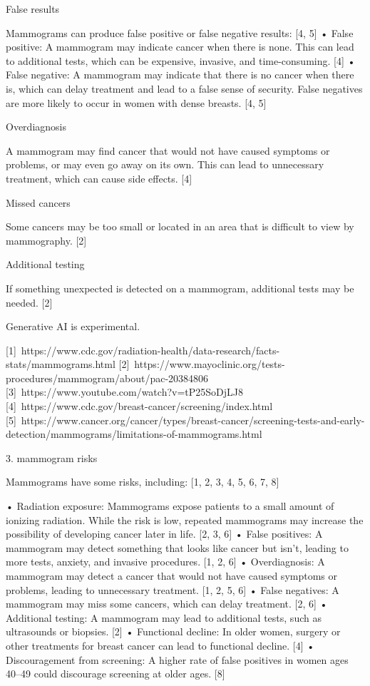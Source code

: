 False results 

Mammograms can produce false positive or false negative results: [4, 5]  • False positive: A mammogram may indicate cancer when there is none. This can lead to additional tests, which can be expensive, invasive, and time-consuming. [4]  
• False negative: A mammogram may indicate that there is no cancer when there is, which can delay treatment and lead to a false sense of security. False negatives are more likely to occur in women with dense breasts. [4, 5]  



Overdiagnosis 

A mammogram may find cancer that would not have caused symptoms or problems, or may even go away on its own. This can lead to unnecessary treatment, which can cause side effects. [4]  

Missed cancers 

Some cancers may be too small or located in an area that is difficult to view by mammography. [2]  

Additional testing 

If something unexpected is detected on a mammogram, additional tests may be needed. [2]  



Generative AI is experimental.

[1] https://www.cdc.gov/radiation-health/data-research/facts-stats/mammograms.html
[2] https://www.mayoclinic.org/tests-procedures/mammogram/about/pac-20384806
[3] https://www.youtube.com/watch?v=tP25SoDjLJ8
[4] https://www.cdc.gov/breast-cancer/screening/index.html
[5] https://www.cancer.org/cancer/types/breast-cancer/screening-tests-and-early-detection/mammograms/limitations-of-mammograms.html


3. mammogram risks

Mammograms have some risks, including: [1, 2, 3, 4, 5, 6, 7, 8]  

• Radiation exposure: Mammograms expose patients to a small amount of ionizing radiation. While the risk is low, repeated mammograms may increase the possibility of developing cancer later in life. [2, 3, 6]  
• False positives: A mammogram may detect something that looks like cancer but isn't, leading to more tests, anxiety, and invasive procedures. [1, 2, 6]  
• Overdiagnosis: A mammogram may detect a cancer that would not have caused symptoms or problems, leading to unnecessary treatment. [1, 2, 5, 6]  
• False negatives: A mammogram may miss some cancers, which can delay treatment. [2, 6]  
• Additional testing: A mammogram may lead to additional tests, such as ultrasounds or biopsies. [2]  
• Functional decline: In older women, surgery or other treatments for breast cancer can lead to functional decline. [4]  
• Discouragement from screening: A higher rate of false positives in women ages 40–49 could discourage screening at older ages. [8]  


